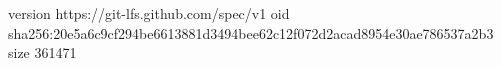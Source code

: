 version https://git-lfs.github.com/spec/v1
oid sha256:20e5a6c9cf294be6613881d3494bee62c12f072d2acad8954e30ae786537a2b3
size 361471
